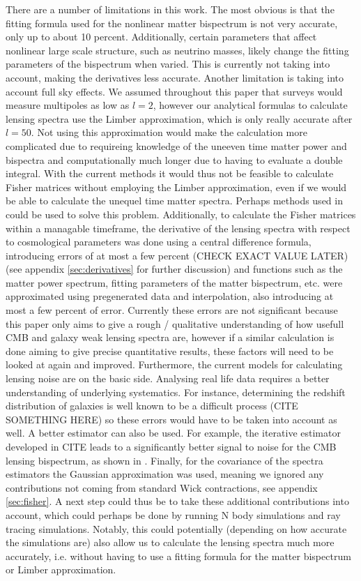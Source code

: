 \documentclass[11pt]{article} %
\begin{document}
There are a number of limitations in this work. The most obvious is that the fitting formula used for the nonlinear matter bispectrum is not very accurate, only up to about 10 percent. Additionally, certain parameters that affect nonlinear large scale structure, such as neutrino masses, likely change the fitting parameters of the bispectrum when varied. This is currently not taking into account, making the derivatives less accurate.
Another limitation is taking into account full sky effects. We assumed throughout this paper that surveys would measure multipoles as low as $l=2$, however our analytical formulas to calculate lensing spectra use the Limber approximation, which is only really accurate after $l=50$. Not using this approximation would make the calculation more complicated due to requireing knowledge of the uneeven time matter power and bispectra and computationally much longer due to having to evaluate a double integral. With the current methods it would thus not be feasible to calculate Fisher matrices without employing the Limber approximation, even if we would be able to calculate the unequel time matter spectra. Perhaps methods used in \cite{Chen:2021vba} could be used to solve this problem.
Additionally, to calculate the Fisher matrices within a managable timeframe, the derivative of the lensing spectra with respect to cosmological parameters was done using a central difference formula, introducing errors of at most a few percent (CHECK EXACT VALUE LATER) (see appendix \ref{sec:derivatives} for further discussion) and functions such as the matter power spectrum, fitting parameters of the matter bispectrum, etc. were approximated using pregenerated data and interpolation, also introducing at most a few percent of error. Currently these errors are not significant because this paper only aims to give a rough / qualitative understanding of how usefull CMB and galaxy weak lensing spectra are, however if a similar calculation is done aiming to give precise quantitative results, these factors will need to be looked at again and improved.
Furthermore, the current models for calculating lensing noise are on the basic side. Analysing real life data requires a better understanding of underlying systematics. For instance, determining the redshift distribution of galaxies is well known to be a difficult process (CITE SOMETHING HERE) so these errors would have to be taken into account as well. A better estimator can also be used. For example, the iterative estimator developed in CITE leads to a significantly better signal to noise for the CMB lensing bispectrum, as shown in \cite{Namikawa_2016}. 
Finally, for the covariance of the spectra estimators the Gaussian approximation was used, meaning we ignored any contributions not coming from standard Wick contractions, see appendix \ref{sec:fisher}. A next step could thus be to take these additional contributions into account, which could perhaps be done by running N body simulations and ray tracing simulations. Notably, this could potentially (depending on how accurate the simulations are) also allow us to calculate the lensing spectra much more accurately, i.e. without having to use a fitting formula for the matter bispectrum or Limber approximation.
\end{document}
